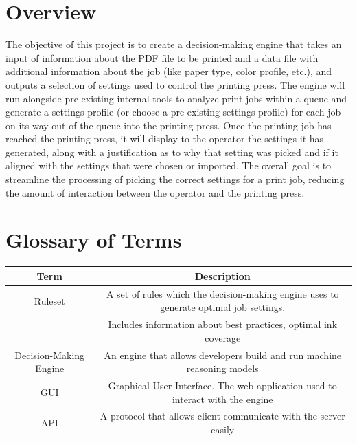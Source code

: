 \documentclass[onecolumn, draftclsnofoot,10pt, compsoc]{IEEEtran}
\begin{document}
\clearpage

\section{Overview}
The objective of this project is to create a decision-making engine that takes an input of information about the PDF file to be printed and a data file with additional information about the job (like paper type, color profile, etc.), and outputs a selection of settings used to control the printing press. The engine will run alongside pre-existing internal tools to analyze print jobs within a queue and generate a settings profile (or choose a pre-existing settings profile) for each job on its way out of the queue into the printing press. Once the printing job has reached the printing press, it will display to the operator the settings it has generated, along with a justification as to why that setting was picked and if it aligned with the settings that were chosen or imported. The overall goal is to streamline the processing of picking the correct settings for a print job, reducing the amount of interaction between the operator and the printing press.

\bigskip
\section{Glossary of Terms}
\begin{center}
\begin{tabular}{|c|c|}
  \hline
  \textbf{Term} & \textbf{Description}\\
  \hline
  Ruleset  & A set of rules which the decision-making engine uses to generate optimal job settings.\\ & Includes information about best practices, optimal ink coverage\\ 
  \hline
  Decision-Making Engine   & An engine that allows developers build and run machine reasoning models\\
  \hline
  GUI & Graphical User Interface. The web application used to interact with the engine\\
  \hline
  API & A protocol that allows client communicate with the server easily\\
  \hline
\end{tabular}
\end{center}

\bigskip
\end{document}
